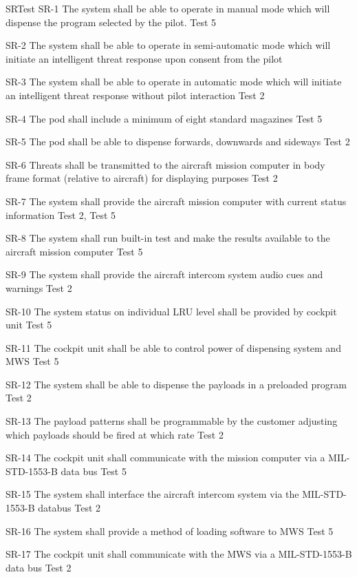 \documentclass[Main]{subfiles}
\begin{document}
\begin{TraceForward}{SR}{Test}\label{ForwardTrace}
\TF
{SR-1}
{The system shall be able to operate in manual mode which will dispense the program selected by the pilot.}
{Test 5}

\TF
{SR-2}
{The system shall be able to operate in semi-automatic mode which will initiate an intelligent threat response upon consent from the pilot}
{}

\TF
{SR-3}
{The system shall be able to operate in automatic mode which will initiate an intelligent threat response without pilot interaction}
{Test 2}

\TF
{SR-4}
{The pod shall include a minimum of eight standard magazines}
{Test 5}

\TF
{SR-5}
{The pod shall be able to dispense forwards, downwards and sideways}
{Test 2}

\TF
{SR-6}
{Threats shall be transmitted to the aircraft mission computer in body frame format (relative to aircraft) for displaying purposes}
{Test 2}

\TF
{SR-7}
{The system shall provide the aircraft mission computer with current status information}
{Test 2, Test 5}

\TF
{SR-8}
{The system shall run built-in test and make the results available to the aircraft mission computer}
{Test 5}

\TF
{SR-9}
{The system shall provide the aircraft intercom system audio cues and warnings}
{Test 2}

\TF
{SR-10}
{The system status on individual LRU level shall be provided by cockpit unit}
{Test 5}

\TF
{SR-11}
{The cockpit unit shall be able to control power of dispensing system and MWS}
{Test 5}

\TF
{SR-12}
{The system shall be able to dispense the payloads in a preloaded program}
{Test 2}

\TF
{SR-13}
{The payload patterns shall be programmable by the customer adjusting which payloads should be fired at which rate}
{Test 2}

\TF
{SR-14}
{The cockpit unit shall communicate with the mission computer via a MIL-STD-1553-B data bus}
{Test 5}

\TF
{SR-15}
{The system shall interface the aircraft intercom system via the MIL-STD-1553-B databus}
{Test 2}

\TF
{SR-16}
{The system shall provide a method of loading software to MWS}
{Test 5}

\TF
{SR-17}
{The cockpit unit shall communicate with the MWS via a MIL-STD-1553-B data bus}
{Test 2}


\end{TraceForward}
\end{document}
